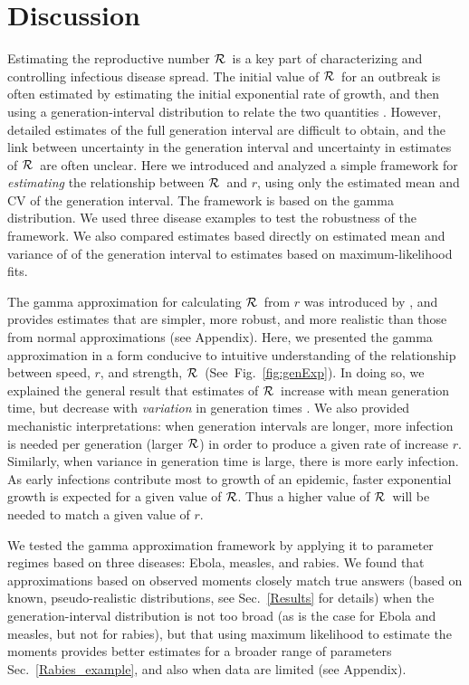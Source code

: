 \documentclass[12pt]{article}
\newcommand{\RR}{\ensuremath{{\cal R}}}
\newcommand{\fref}[1]{Fig.~\ref{fig:#1}}
\newcommand{\sref}[1]{Sec.~\ref{#1}}
\begin{document}
\section{Discussion}

Estimating the reproductive number \RR\ is a key part of characterizing and controlling infectious disease spread. The initial value of \RR\ for an outbreak is often estimated by estimating the initial exponential rate of growth, and then using a generation-interval distribution to relate the two quantities \cite{WallLips07,Sven07,Nish10,Sven15}.
However, detailed estimates of the full generation interval are difficult to obtain, and the link between uncertainty in the generation interval and uncertainty in estimates of \RR\ are often unclear.
Here we introduced and analyzed a simple framework for \emph{estimating} the relationship between \RR\ and $r$, using only the estimated mean and CV of the generation interval. The framework is based on the gamma distribution. We used three disease examples to test the robustness of the framework. We also compared estimates based directly on estimated mean and variance of of the generation interval to estimates based on maximum-likelihood fits.

The gamma approximation for calculating \RR\ from $r$ was introduced by \cite{NishCast09}, and provides estimates that are simpler, more robust, and more realistic than those from normal approximations (see Appendix).
Here, we presented the gamma approximation in a form conducive to intuitive understanding of the relationship between speed, $r$, and strength, \RR\ (See~\fref{genExp}).
In doing so, we explained the general result that estimates of \RR\ increase with mean generation time, but decrease with \emph{variation} in generation times \cite{WallLips07, wearing2005appropriate, roberts2007model}.
We also provided mechanistic interpretations: when generation intervals are longer, more infection is needed per generation (larger \RR)  in order to produce a given rate of increase $r$. 
Similarly, when variance in generation time is large, there is more early infection.
As early infections contribute most to growth of an epidemic, faster exponential growth is expected for a given value of \RR.
Thus a higher value of \RR\ will be needed to match a given value of $r$. 

We tested the gamma approximation framework by applying it to parameter regimes based on three diseases: Ebola, measles, and rabies. 
We found that approximations based on observed moments closely match true answers (based on known, pseudo-realistic distributions, see \sref{Results} for details) when the generation-interval distribution is not too broad (as is the case for Ebola and measles, but not for rabies), but that using maximum likelihood to estimate the moments provides better estimates for a broader range of parameters \sref{Rabies_example}, and also when data are limited (see Appendix).
\end{document}
